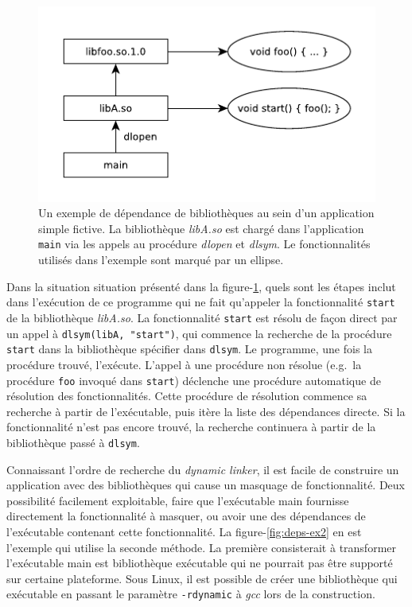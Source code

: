 \begin{center}
    \begin{figure}[ht]
        \includegraphics{figures/libdeps-ex1.pdf}
        \caption{Un exemple de dépendance de bibliothèques au sein d'un application simple fictive.
            La bibliothèque \textit{libA.so} est chargé dans l'application \texttt{main} via
            les appels au procédure \textit{dlopen} et \textit{dlsym}. Le fonctionnalités utilisés
            dans l'exemple sont marqué par un ellipse.
        }
        \label{fig:deps-ex1}
    \end{figure}
\end{center}

Dans la situation situation présenté dans la figure-\ref{fig:deps-ex1}, quels sont les étapes inclut
dans l'exécution de ce programme qui ne fait qu'appeler la fonctionnalité \texttt{start} de la
bibliothèque \textit{libA.so}. La fonctionnalité \texttt{start} est résolu de façon direct par
un appel à \verb|dlsym(libA, "start")|, qui commence la recherche de la procédure \texttt{start} dans
la bibliothèque spécifier dans \texttt{dlsym}. Le programme, une fois la procédure trouvé, l'exécute.
L'appel à une procédure non résolue (e.g.\ la procédure \texttt{foo} invoqué dans \texttt{start})
déclenche une procédure automatique de résolution des fonctionnalités. Cette procédure de résolution
commence sa recherche à partir de l'exécutable, puis itère la liste des dépendances directe. Si la
fonctionnalité n'est pas encore trouvé, la recherche continuera à partir de la bibliothèque passé à
\texttt{dlsym}.


Connaissant l'ordre de recherche du \textit{dynamic linker}, il est facile de construire un application avec des bibliothèques
qui cause un masquage de fonctionnalité. Deux possibilité facilement exploitable, faire que l'exécutable main fournisse
directement la fonctionnalité à masquer, ou avoir une des dépendances de l'exécutable contenant cette fonctionnalité. La figure-\ref{fig:deps-ex2}
en est l'exemple qui utilise la seconde méthode. La première consisterait à transformer l'exécutable main est bibliothèque
exécutable qui ne pourrait pas être supporté sur certaine plateforme. Sous Linux, il est possible de créer une bibliothèque qui
exécutable en passant le paramètre \texttt{-rdynamic} à \textit{gcc} lors de la construction.

